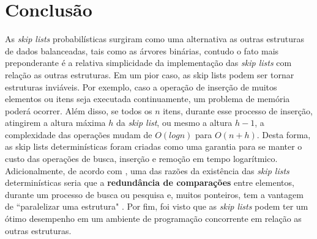 \documentclass[paper=a4, fontsize=11pt]{scrartcl} %
\numberwithin{equation}{section}
\numberwithin{figure}{section}
\numberwithin{table}{section}
\numberwithin{definition}{section}
\numberwithin{theorem}{section}
\numberwithin{property}{section}
\numberwithin{proposition}{section}
\begin{document}
\section{Conclus\~{a}o}

As \textit{skip lists} probabil\'{i}sticas surgiram como uma alternativa as outras estruturas de dados balanceadas, tais como as \'{a}rvores bin\'{a}rias, contudo o fato mais preponderante \'{e} a relativa simplicidade da implementa\c{c}\~{a}o das \textit{skip lists} com rela\c{c}\~{a}o as outras estruturas. Em um pior caso, as skip lists podem ser tornar estruturas invi\'{a}veis. Por exemplo, caso a opera\c{c}\~{a}o de inser\c{c}\~{a}o de muitos elementos ou itens seja executada continuamente, um problema de mem\'{o}ria poder\'{a} ocorrer. Al\'{e}m disso, se todos os $n$ itens, durante esse processo de inser\c{c}\~{a}o, atingirem a altura m\'{a}xima $h$ da \textit{skip list}, ou mesmo a altura $h-1$,  a complexidade das opera\c{c}\~{o}es mudam de $O(logn)$ para $O(n + h)$. Desta forma, as skip lists determin\'{i}sticas foram criadas como uma garantia para se manter o custo das opera\c{c}\~{o}es de busca, inser\c{c}\~{a}o e remo\c{c}\~{a}o em tempo logar\'{i}tmico. 
Adicionalmente, de acordo com \cite{munro1992deterministic}, uma das raz\~{o}es da exist\^{e}ncia das \textit{skip lists} determin\'{i}sticas seria que a \textbf{redund\^{a}ncia de compara\c{c}\~{o}es} entre elementos, durante um processo de busca ou pesquisa e, muitos ponteiros, tem a vantagem de ``paralelizar uma estrutura" . Por fim, foi visto que as \textit{skip lists} podem ter um \'{o}timo desempenho em um ambiente de programa\c{c}\~{a}o concorrente em rela\c{c}\~{a}o as outras estruturas.   

{}
\end{document}
